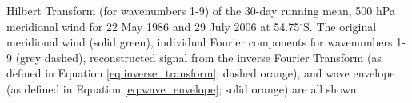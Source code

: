 \label{fig:example_hilbert}
Hilbert Transform (for wavenumbers 1-9) of the 30-day running mean, 500 hPa meridional wind for 22 May 1986 and 29 July 2006 at 54.75$^{\circ}$S. The original meridional wind (solid green), individual Fourier components for wavenumbers 1-9 (grey dashed), reconstructed signal from the inverse Fourier Transform (as defined in Equation \ref{eq:inverse_transform}; dashed orange), and wave envelope (as defined in Equation \ref{eq:wave_envelope}; solid orange) are all shown.